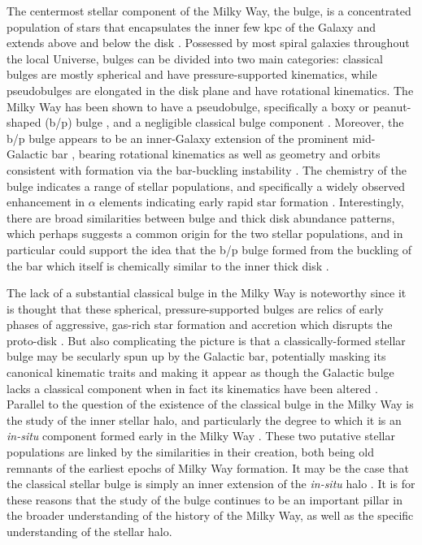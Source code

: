 The centermost stellar component of the Milky Way, the bulge, is a concentrated population of stars that encapsulates the inner few kpc of the Galaxy and extends above and below the disk \parencite{baade46}. Possessed by most spiral galaxies throughout the local Universe, bulges can be divided into two main categories: classical bulges are mostly spherical and have pressure-supported kinematics, while pseudobulges are elongated in the disk plane and have rotational kinematics. The Milky Way has been shown to have a pseudobulge, specifically a boxy or peanut-shaped (b/p) bulge \parencite{ness13a,ness13b,wegg13}, and a negligible classical bulge component \parencite{kunder16}. Moreover, the b/p bulge appears to be an inner-Galaxy extension of the prominent mid-Galactic bar \parencite{wegg15}, bearing rotational kinematics as well as geometry and orbits consistent with formation via the bar-buckling instability \parencite{athanassoula05}. The chemistry of the bulge indicates a range of stellar populations, and specifically a widely observed enhancement in $\alpha$ elements indicating early rapid star formation \parencite{mcwilliam16,bensby17}. Interestingly, there are broad similarities between bulge and thick disk abundance patterns, which perhaps suggests a common origin for the two stellar populations, and in particular could support the idea that the b/p bulge formed from the buckling of the bar which itself is chemically similar to the inner thick disk \parencite{dimatteo14}.

The lack of a substantial classical bulge in the Milky Way is noteworthy since it is thought that these spherical, pressure-supported bulges are relics of early phases of aggressive, gas-rich star formation and accretion which disrupts the proto-disk \parencite{steinmetz95,samland03,obreja13}. But also complicating the picture is that a classically-formed stellar bulge may be secularly spun up by the Galactic bar, potentially masking its canonical kinematic traits and making it appear as though the Galactic bulge lacks a classical component when in fact its kinematics have been altered \parencite{saha12}. Parallel to the question of the existence of the classical bulge in the Milky Way is the study of the inner stellar halo, and particularly the degree to which it is an \textit{in-situ} component formed early in the Milky Way \parencite[e.g.][]{rix22}. These two putative stellar populations are linked by the similarities in their creation, both being old remnants of the earliest epochs of Milky Way formation. It may be the case that the classical stellar bulge is simply an inner extension of the \textit{in-situ} halo \parencite{perez-villegas17}. It is for these reasons that the study of the bulge continues to be an important pillar in the broader understanding of the history of the Milky Way, as well as the specific understanding of the stellar halo.


